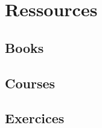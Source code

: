 \documentclass{article}
\begin{document}
\section{Ressources}%
\label{sec:Ressources}

\subsection{Books}%
\label{sub:Books}

\subsection{Courses}%
\label{sub:Courses}

\subsection{Exercices}%
\label{sub:Exercices}
\end{document}
